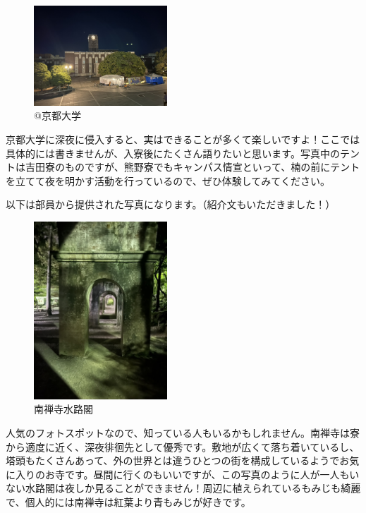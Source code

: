 \begin{figure}[H]
    \centering
    \includegraphics[width=5cm]{2025shinki/shinya_haikai/image4.png}
    \caption{@京都大学}
    \label{fig:enter-label4}
\end{figure}
京都大学に深夜に侵入すると、実はできることが多くて楽しいですよ！ここでは具体的には書きませんが、入寮後にたくさん語りたいと思います。写真中のテントは吉田寮のものですが、熊野寮でもキャンパス情宣といって、楠の前にテントを立てて夜を明かす活動を行っているので、ぜひ体験してみてください。\\ \indent

以下は部員から提供された写真になります。（紹介文もいただきました！）
\begin{figure}[H]
    \centering
    \includegraphics[width=5cm]{2025shinki/shinya_haikai/image5.png}
    \caption{南禅寺水路閣}
    \label{fig:enter-label5}
\end{figure}
人気のフォトスポットなので、知っている人もいるかもしれません。南禅寺は寮から適度に近く、深夜徘徊先として優秀です。敷地が広くて落ち着いているし、塔頭もたくさんあって、外の世界とは違うひとつの街を構成しているようでお気に入りのお寺です。昼間に行くのもいいですが、この写真のように人が一人もいない水路閣は夜しか見ることができません！周辺に植えられているもみじも綺麗で、個人的には南禅寺は紅葉より青もみじが好きです。


